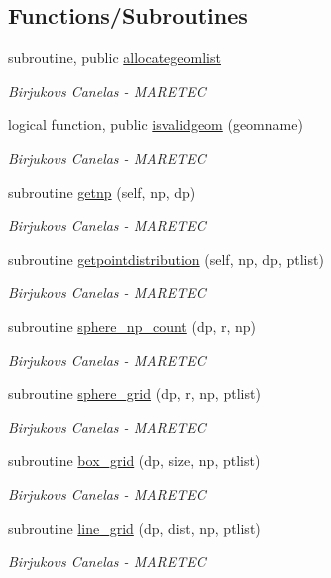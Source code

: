 \subsection*{Functions/\+Subroutines}
\begin{DoxyCompactItemize}
\item 
subroutine, public \mbox{\hyperlink{namespacegeometry_a17652db20fde3f883b4fc778e0e6cdda}{allocategeomlist}}
\begin{DoxyCompactList}\small\item\em Birjukovs Canelas -\/ M\+A\+R\+E\+T\+EC \end{DoxyCompactList}\item 
logical function, public \mbox{\hyperlink{namespacegeometry_a56488a00edf7ba4e670ceffd5c36f13f}{isvalidgeom}} (geomname)
\begin{DoxyCompactList}\small\item\em Birjukovs Canelas -\/ M\+A\+R\+E\+T\+EC \end{DoxyCompactList}\item 
subroutine \mbox{\hyperlink{namespacegeometry_ad14d7800ac13b9a6722ac96b06ce94c9}{getnp}} (self, np, dp)
\begin{DoxyCompactList}\small\item\em Birjukovs Canelas -\/ M\+A\+R\+E\+T\+EC \end{DoxyCompactList}\item 
subroutine \mbox{\hyperlink{namespacegeometry_a726dae6e63f052138bd3346de439fbc4}{getpointdistribution}} (self, np, dp, ptlist)
\begin{DoxyCompactList}\small\item\em Birjukovs Canelas -\/ M\+A\+R\+E\+T\+EC \end{DoxyCompactList}\item 
subroutine \mbox{\hyperlink{namespacegeometry_a4f070ef95bffe3bbb21bd251ae5ca6c7}{sphere\+\_\+np\+\_\+count}} (dp, r, np)
\begin{DoxyCompactList}\small\item\em Birjukovs Canelas -\/ M\+A\+R\+E\+T\+EC \end{DoxyCompactList}\item 
subroutine \mbox{\hyperlink{namespacegeometry_a9629040285de7053d42f434333528702}{sphere\+\_\+grid}} (dp, r, np, ptlist)
\begin{DoxyCompactList}\small\item\em Birjukovs Canelas -\/ M\+A\+R\+E\+T\+EC \end{DoxyCompactList}\item 
subroutine \mbox{\hyperlink{namespacegeometry_ab7f40c137db819829d3110dac77a2977}{box\+\_\+grid}} (dp, size, np, ptlist)
\begin{DoxyCompactList}\small\item\em Birjukovs Canelas -\/ M\+A\+R\+E\+T\+EC \end{DoxyCompactList}\item 
subroutine \mbox{\hyperlink{namespacegeometry_a7d580229bc67448e6389d0beef0c04cb}{line\+\_\+grid}} (dp, dist, np, ptlist)
\begin{DoxyCompactList}\small\item\em Birjukovs Canelas -\/ M\+A\+R\+E\+T\+EC \end{DoxyCompactList}\end{DoxyCompactItemize}

